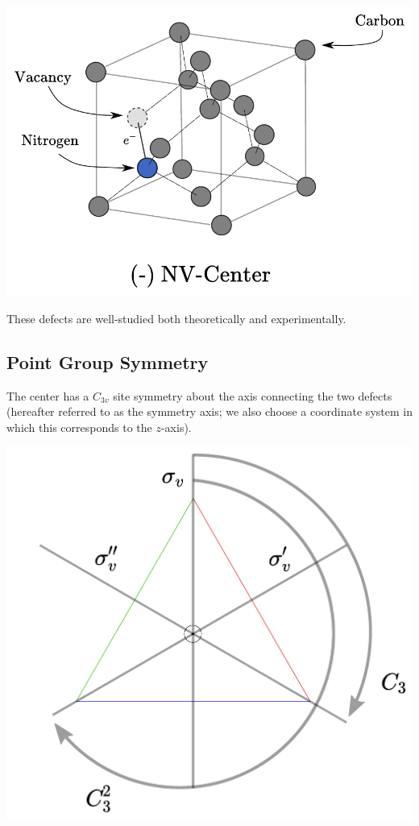 \documentclass[10pt,a4paper]{article}
\begin{document}
\begin{multicols}{2}
\begin{center}
\includegraphics[scale=0.53]{diamond_nv.pdf}

\end{center}
These defects are well-studied both theoretically and experimentally.


\subsection{Point Group Symmetry}
The center has a $C_{3v}$ site symmetry about the axis connecting the two defects (hereafter referred to as the symmetry axis; we also choose a coordinate system in which this corresponds to the $z$-axis).

\begin{center}
\includegraphics[scale=0.4]{symmetry.pdf}
\end{center}


\end{multicols}
\end{document}
